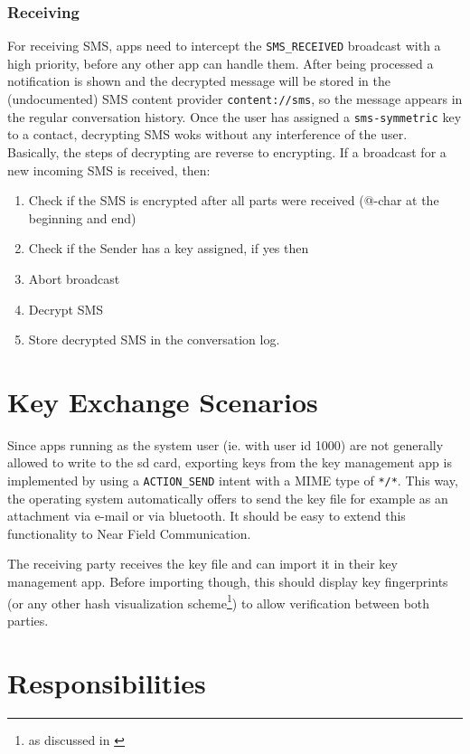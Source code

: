 \documentclass[a4paper,draft]{scrartcl}
\begin{document}
		\subsubsection{Receiving}
      For receiving SMS, apps need to intercept the \texttt{SMS\_RECEIVED} broadcast with a high priority, before any other app can handle them. After being processed a notification is shown and the decrypted message will be stored in the (undocumented) SMS content provider \texttt{content://sms}, so the message appears in the regular conversation history.	Once the user has assigned a \texttt{sms-symmetric} key to a contact, decrypting SMS woks without any interference of the user. Basically, the steps of decrypting are reverse to encrypting. If a broadcast for a new incoming SMS is received, then:
			\begin{enumerate}
				\item Check if the SMS is encrypted after all parts were received (@-char at the beginning and end)
				\item Check if the Sender has a key assigned, if yes then
				\item Abort broadcast
				\item Decrypt SMS
				\item Store decrypted SMS in the conversation log.
			\end{enumerate}

\section{Key Exchange Scenarios}
	Since apps running as the system user (ie. with user id 1000) are not generally allowed to write to the sd card,
	exporting keys from the key management app is implemented by using a \texttt{ACTION\_SEND} intent with a MIME type
	of \texttt{*/*}. This way, the operating system automatically offers to send the key file for example as an attachment
	via e-mail or via bluetooth. It should be easy to extend this functionality to Near Field Communication.

	The receiving party receives the key file and can import it in their key management app. Before importing though,
	this should display key fingerprints (or any other hash visualization scheme\footnote{as discussed in \cite{perrig99}})
	to allow verification between both parties.
	
\section{Responsibilities}
	
\end{document}

